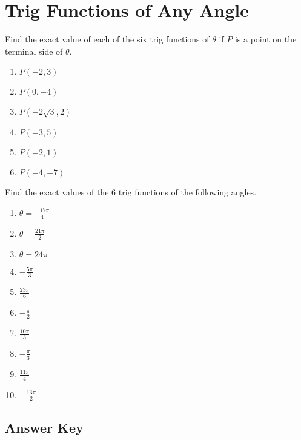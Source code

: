 \chapter{Trig Functions of Any Angle}

Find the exact value of each of the six trig functions of $\theta$ if $P$ is a point on the terminal side of $\theta$.

\begin{multicols}{3}
\begin{enumerate}
	\item $P(-2, 3)$
	\item $P(0,-4)$
	\item $P(-2\sqrt{3}, 2)$
	\item $P(-3, 5)$
	\item $P(-2, 1)$
	\item $P(-4, -7)$
\end{enumerate}	\setcounter{Review}{\value{enumi}}
\end{multicols}

Find the exact values of the 6 trig functions of the following angles.

\begin{multicols}{2}
\begin{enumerate}		\setcounter{enumi}{\value{Review}}	\setlength{\itemsep}{10pt}
	\item $\theta = \frac{-17\pi}{4}$
	\item $\theta = \frac{21\pi}{2}$
	\item $\theta = 24\pi$
	\item $-\frac{5\pi}{3}$
    \item $\frac{23\pi}{6}$
    \item $-\frac{\pi}{2}$
    \item $\frac{10\pi}{3}$
    \item $-\frac{\pi}{3}$
    \item $\frac{11\pi}{4}$
    \item $-\frac{13\pi}{2}$
\end{enumerate}
\end{multicols}

\newpage

\section{Answer Key}


